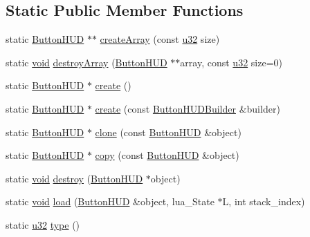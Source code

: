 \subsection*{Static Public Member Functions}
\begin{DoxyCompactItemize}
\item 
static \mbox{\hyperlink{classnjli_1_1_button_h_u_d}{Button\+H\+UD}} $\ast$$\ast$ \mbox{\hyperlink{classnjli_1_1_button_h_u_d_aa1d06fd625897be831ed75aacb99631f}{create\+Array}} (const \mbox{\hyperlink{_util_8h_a10e94b422ef0c20dcdec20d31a1f5049}{u32}} size)
\item 
static \mbox{\hyperlink{_thread_8h_af1e856da2e658414cb2456cb6f7ebc66}{void}} \mbox{\hyperlink{classnjli_1_1_button_h_u_d_a493b9dd71eb34cfee436005674a92f12}{destroy\+Array}} (\mbox{\hyperlink{classnjli_1_1_button_h_u_d}{Button\+H\+UD}} $\ast$$\ast$array, const \mbox{\hyperlink{_util_8h_a10e94b422ef0c20dcdec20d31a1f5049}{u32}} size=0)
\item 
static \mbox{\hyperlink{classnjli_1_1_button_h_u_d}{Button\+H\+UD}} $\ast$ \mbox{\hyperlink{classnjli_1_1_button_h_u_d_ab24831855246bea2728f14c7c657d1a5}{create}} ()
\item 
static \mbox{\hyperlink{classnjli_1_1_button_h_u_d}{Button\+H\+UD}} $\ast$ \mbox{\hyperlink{classnjli_1_1_button_h_u_d_a3de59d29761170b76b44eff099b4b649}{create}} (const \mbox{\hyperlink{classnjli_1_1_button_h_u_d_builder}{Button\+H\+U\+D\+Builder}} \&builder)
\item 
static \mbox{\hyperlink{classnjli_1_1_button_h_u_d}{Button\+H\+UD}} $\ast$ \mbox{\hyperlink{classnjli_1_1_button_h_u_d_a9ba2fb86b1b725d947ddb21d338ef1cf}{clone}} (const \mbox{\hyperlink{classnjli_1_1_button_h_u_d}{Button\+H\+UD}} \&object)
\item 
static \mbox{\hyperlink{classnjli_1_1_button_h_u_d}{Button\+H\+UD}} $\ast$ \mbox{\hyperlink{classnjli_1_1_button_h_u_d_ab4f81ff5e8720b507354e5d9254e1ddf}{copy}} (const \mbox{\hyperlink{classnjli_1_1_button_h_u_d}{Button\+H\+UD}} \&object)
\item 
static \mbox{\hyperlink{_thread_8h_af1e856da2e658414cb2456cb6f7ebc66}{void}} \mbox{\hyperlink{classnjli_1_1_button_h_u_d_a92a3967c328fb717935fb4667544e1c4}{destroy}} (\mbox{\hyperlink{classnjli_1_1_button_h_u_d}{Button\+H\+UD}} $\ast$object)
\item 
static \mbox{\hyperlink{_thread_8h_af1e856da2e658414cb2456cb6f7ebc66}{void}} \mbox{\hyperlink{classnjli_1_1_button_h_u_d_a2584ca1f6eb5a9dd7db13261f7a01cb3}{load}} (\mbox{\hyperlink{classnjli_1_1_button_h_u_d}{Button\+H\+UD}} \&object, lua\+\_\+\+State $\ast$L, int stack\+\_\+index)
\item 
static \mbox{\hyperlink{_util_8h_a10e94b422ef0c20dcdec20d31a1f5049}{u32}} \mbox{\hyperlink{classnjli_1_1_button_h_u_d_ad2c1e7f0adb647dea2f8fd6b2b77dd9a}{type}} ()
\end{DoxyCompactItemize}

